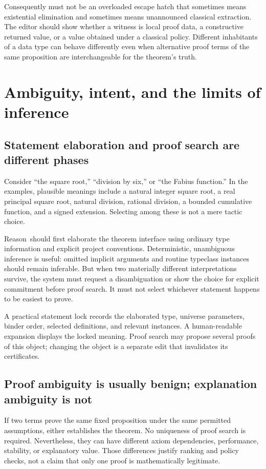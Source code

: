 \documentclass[11pt,a4paper]{article}
\newcommand{\Reason}{\textsf{Reason}}
\newcommand{\code}[1]{\texttt{\detokenize{#1}}}
\theoremstyle{remark}
\begin{document}
Consequently \code{choose} must not be an overloaded escape hatch that sometimes means existential elimination and sometimes means unannounced classical extraction. The editor should show whether a witness is local proof data, a constructive returned value, or a value obtained under a classical policy. Different inhabitants of a data type can behave differently even when alternative proof terms of the same proposition are interchangeable for the theorem's truth.

\section{Ambiguity, intent, and the limits of inference}\label{sec:ambiguity}

\subsection{Statement elaboration and proof search are different phases}

Consider ``the square root,'' ``division by six,'' or ``the Fabius function.'' In the examples, plausible meanings include a natural integer square root, a real principal square root, natural division, rational division, a bounded cumulative function, and a signed extension. Selecting among these is not a mere tactic choice.

\Reason\ should first elaborate the theorem interface using ordinary type information and explicit project conventions. Deterministic, unambiguous inference is useful: omitted implicit arguments and routine typeclass instances should remain inferable. But when two materially different interpretations survive, the system must request a disambiguation or show the choice for explicit commitment before proof search. It must not select whichever statement happens to be easiest to prove.

A practical statement lock records the elaborated type, universe parameters, binder order, selected definitions, and relevant instances. A human-readable expansion displays the locked meaning. Proof search may propose several proofs of this object; changing the object is a separate edit that invalidates its certificates.

\subsection{Proof ambiguity is usually benign; explanation ambiguity is not}

If two terms prove the same fixed proposition under the same permitted assumptions, either establishes the theorem. No uniqueness of proof search is required. Nevertheless, they can have different axiom dependencies, performance, stability, or explanatory value. Those differences justify ranking and policy checks, not a claim that only one proof is mathematically legitimate.
\end{document}
